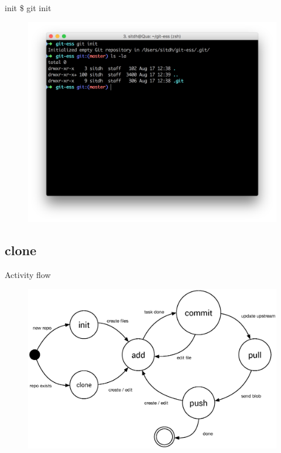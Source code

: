 \documentclass{beamer}
\begin{document}
\begin{frame}{init}
    \Large{\$ git init}
    \begin{figure}
        \center
        \includegraphics[width=.9\textwidth]{git-init}
        \label{fig:git-init}
    \end{figure}
\end{frame}

\subsection[clone]{clone}
\begin{frame}{Activity flow}
    \begin{figure}
        \center
        \includegraphics[width=.9\textwidth]{git-command-flow}
        \label{fig:git-command-flow}
    \end{figure}
\end{frame}
\end{document}
